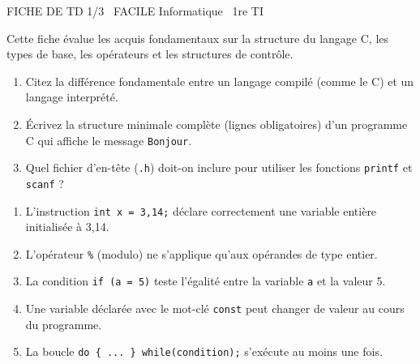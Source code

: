 \documentclass[11pt]{article}
\begin{document}
\begin{tcolorbox}[enhanced,colback=popink,colframe=popink,arc=10pt,boxrule=0pt,left=12pt,right=12pt,top=9pt,bottom=9pt]
{\color{white}\popxbold\small FICHE DE TD 1/3 \textbullet\ FACILE \hfill Informatique \textbullet\ 1re TI\par}
\end{tcolorbox}
\vspace{4pt}
Cette fiche évalue les acquis fondamentaux sur la structure du langage C, les types de base, les opérateurs et les structures de contrôle.

\begin{exercice}
\begin{enumerate}
    \item Citez la différence fondamentale entre un langage compilé (comme le C) et un langage interprété.
    \item Écrivez la structure minimale complète (lignes obligatoires) d'un programme C qui affiche le message \texttt{Bonjour}.
    \item Quel fichier d'en-tête (\texttt{.h}) doit-on inclure pour utiliser les fonctions \texttt{printf} et \texttt{scanf} ?
\end{enumerate}
\end{exercice}

\begin{exercice}
\begin{enumerate}
    \item L'instruction \texttt{int x = 3,14;} déclare correctement une variable entière initialisée à 3,14.
    \item L'opérateur \texttt{\%} (modulo) ne s'applique qu'aux opérandes de type entier.
    \item La condition \texttt{if (a = 5)} teste l'égalité entre la variable \texttt{a} et la valeur 5.
    \item Une variable déclarée avec le mot-clé \texttt{const} peut changer de valeur au cours du programme.
    \item La boucle \texttt{do \{ ... \} while(condition);} s'exécute au moins une fois.
\end{enumerate}
\end{exercice}
\end{document}
